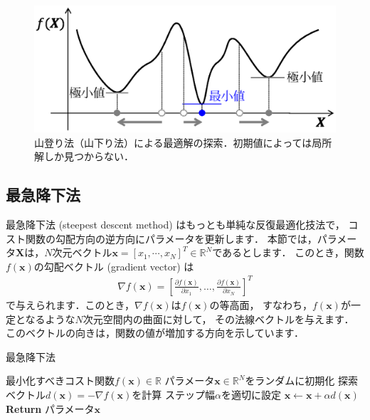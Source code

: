 \begin{figure}[t]
\centering
\includegraphics[width=.93\linewidth]{sections/optimization/hill_climbing}
\caption{山登り法（山下り法）による最適解の探索．初期値によっては局所解しか見つからない．}
\label{fig:hill_climbing}
\end{figure}

\subsection{最急降下法}
\label{sec:steepest_descent}

最急降下法 (steepest descent method) はもっとも単純な反復最適化技法で，
コスト関数の勾配方向の逆方向にパラメータを更新します．
本節では，パラメータ$\bm{X}$は，$N$次元ベクトル$\bm{x} = [x_1,\cdots,x_N]^T\in \mathbb{R}^N$であるとします．
このとき，関数$f(\bm{x})$の勾配ベクトル (gradient vector) は
\begin{align}
\nabla f(\bm{x}) = \left[\frac{\partial f(\bm{x})}{\partial x_1},\ldots,\frac{\partial f(\bm{x})}{\partial x_N}\right]^T
\end{align}
で与えられます．このとき，$\nabla f(\bm{x})$は$f(\bm{x})$の等高面，
すなわち，$f(\bm{x})$が一定となるような$N$次元空間内の曲面に対して，
その法線ベクトルを与えます．
このベクトルの向きは，関数の値が増加する方向を示しています．

\begin{algobox}{最急降下法}
\label{algo:steepest}
\begin{algorithmic}[1]
\Require 最小化すべきコスト関数$f(\bm{x}) \in \mathbb{R}$
\State パラメータ$\bm{x} \in \mathbb{R}^N$をランダムに初期化
\State 探索ベクトル$d(\bm{x}) = - \nabla f(\bm{x})$を計算
\State ステップ幅$\alpha$を適切に設定
\State $\bm{x} \gets \bm{x} + \alpha d(\bm{x})$
\EndWhile\\
{\bf Return} パラメータ$\bm{x}$
\end{algorithmic}
\end{algobox}

